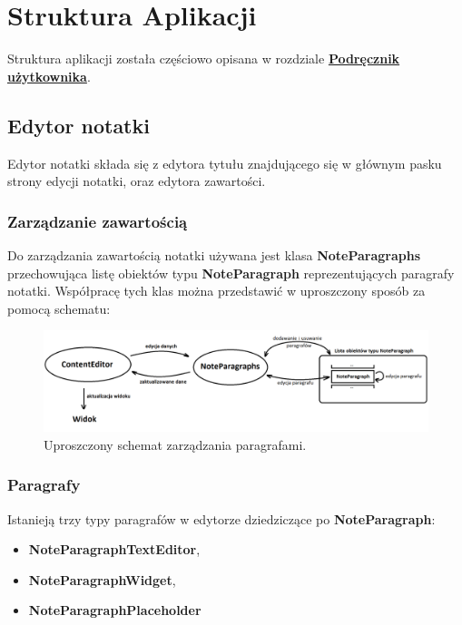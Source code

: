 \chapter{Struktura Aplikacji}

Struktura aplikacji została częściowo opisana w rozdziale \hyperref[ch:manual]{\textbf{Podręcznik użytkownika}}.

\section{Edytor notatki}

Edytor notatki składa się z edytora tytułu znajdującego się w głównym pasku strony edycji notatki, oraz edytora zawartości.

\subsection{Zarządzanie zawartością}

Do zarządzania zawartością notatki używana jest klasa \textbf{NoteParagraphs} przechowująca listę obiektów typu \textbf{NoteParagraph} reprezentujących paragrafy notatki.
Współpracę tych klas można przedstawić w uproszczony sposób za pomocą schematu:

\begin{figure}[ht]
    \centering
    \includegraphics[width=\linewidth]{images/ContentEditor_podzial.png}
    \caption{Uproszczony schemat zarządzania paragrafami.}
\end{figure}

\newpage

\subsection{Paragrafy}

Istanieją trzy typy paragrafów w edytorze dziedziczące po \textbf{NoteParagraph}: 
\begin{itemize}
    \item \textbf{NoteParagraphTextEditor},
    \item \textbf{NoteParagraphWidget},
    \item \textbf{NoteParagraphPlaceholder}
\end{itemize}

